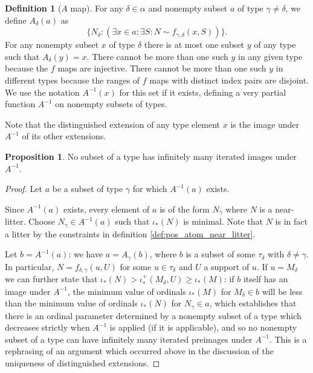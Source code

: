 \documentclass[112pt]{article}
\theoremstyle{definition}
\newtheorem{proposition}[theorem]{Proposition}
\newtheorem{definition}[theorem]{Definition}
\theoremstyle{remark}
\begin{document}
\begin{definition}[$A$ map]\label{def:a_map}
For any $\delta \in \alpha$ and nonempty subset $a$ of type $\gamma \neq \delta$, we define $A_\delta(a)$ as $$\{N_\delta:(\exists x \in a:\exists S:N \sim f_{\gamma,\delta}(x,S))\}.$$  For any nonempty subset $x$ of type $\delta$ there is at most one subset $y$ of any type such that $A_\delta(y)=x$.  There cannot be more than one such $y$ in any given type because the $f$ maps are injective.  There cannot be more than one such $y$ in different types because the ranges of $f$ maps with distinct index pairs are disjoint.   We use the notation $A^{-1}(x)$ for this set if it exists, defining a very partial function $A^{-1}$ on nonempty subsets of types.
\end{definition}

Note that the distinguished extension of any type element $x$ is the image under $A^{-1}$ of its other extensions.

\begin{proposition}\label{prop:a_map_well_founded}
No subset of a type has infinitely many iterated images under $A^{-1}$.
\end{proposition}
\begin{proof}
Let $a$ be a subset of type $\gamma$ for which $A^{-1}(a)$ exists.

Since $A^{-1}(a)$ exists, every element of $a$ is of the form $N_\gamma$ where $N$ is a near-litter.  Choose $N_\gamma \in A^{-1}(a)$ such that $\iota_*(N)$ is minimal.  Note that $N$ is in fact a litter {by the constraints in definition \ref{def:pos_atom_near_litter}}.

Let $b = A^{-1}(a)$:  we have $a = A_\gamma(b)$, where $b$ is a subset of some $\tau_\delta$ with $\delta \neq \gamma$.  In particular, $N = f_{\delta,\gamma}(u,U)$ for
some $u \in \tau_\delta$ and $U$ a support of $u$.  If $u=M_\delta$ we can further state that $\iota_*(N) > \iota^+_*(M_\delta,U) \geq \iota_*(M)$:  if $b$ itself has an image under $A^{-1}$, the minimum value of ordinals $\iota_*(M)$ for $M_\delta \in b$ will be less than the minimum value of ordinals $\iota_*(N)$ for $N_\gamma\in a$, which establishes that there is an ordinal parameter determined by a nonempty subset of a type which decreases strictly when $A^{-1}$ is applied (if it is applicable), and so no nonempty subset of a type
can have infinitely many iterated preimages under $A^{-1}$.  This is a rephrasing of an argument which occurred above in the discussion of the uniqueness of distinguished extensions.
\end{proof}
\end{document}
